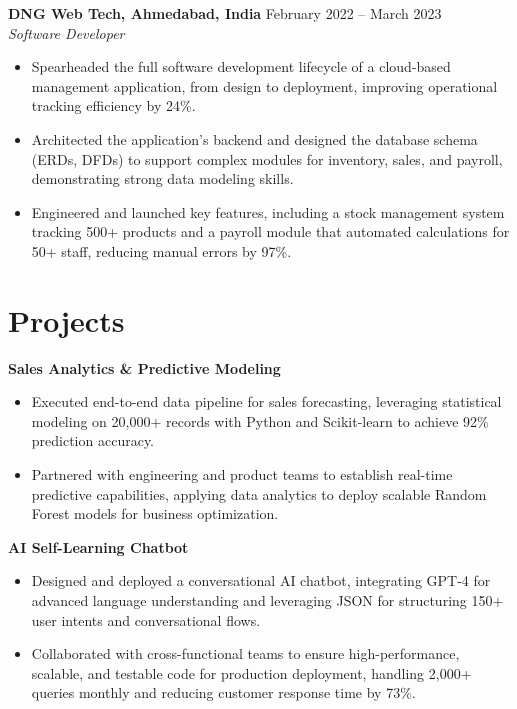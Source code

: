 \documentclass[a4paper,10pt]{article}
\begin{document}
\textbf{DNG Web Tech, Ahmedabad, India} \hfill February 2022 -- March 2023 \\
\textit{Software Developer} \\

\begin{itemize}[leftmargin=*, itemsep=0pt, parsep=1pt] %
\vspace{-7mm}
    \item Spearheaded the full software development lifecycle of a cloud-based management application, from design to deployment, improving operational tracking efficiency by 24\%.
\item Architected the application's backend and designed the database schema (ERDs, DFDs) to support complex modules for inventory, sales, and payroll, demonstrating strong data modeling skills.
\item Engineered and launched key features, including a stock management system tracking 500+ products and a payroll module that automated calculations for 50+ staff, reducing manual errors by 97\%. 

\end{itemize}

\vspace{-4mm}

\section*{Projects}
\textbf{Sales Analytics & Predictive Modeling} \\
\begin{itemize}[leftmargin=*, itemsep=0pt, parsep=1pt]
\vspace{-7mm}
    \item Executed end-to-end data pipeline for sales forecasting, leveraging statistical modeling on 20,000+ records with Python and Scikit-learn to achieve 92\% prediction accuracy.
    \item Partnered with engineering and product teams to establish real-time predictive capabilities, applying data analytics to deploy scalable Random Forest models for business optimization.
    \end{itemize}

\vspace{-2mm}
\textbf{AI Self-Learning Chatbot} \\
\begin{itemize}[leftmargin=*, itemsep=0pt, parsep=1pt]
\vspace{-7mm}
    \item Designed and deployed a conversational AI chatbot, integrating GPT-4 for advanced language understanding and leveraging JSON for structuring 150+ user intents and conversational flows.
    \item Collaborated with cross-functional teams to ensure high-performance, scalable, and testable code for production deployment, handling 2,000+ queries monthly and reducing customer response time by 73\%.
\end{itemize}

\vspace{-2mm}
\end{document}
